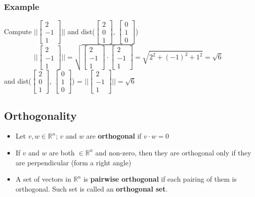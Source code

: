 \subsubsection{Example}
Compute $||\begin{bmatrix} 2 \\ -1 \\ 1 \end{bmatrix}||$ and 
dist($\begin{bmatrix} 2 \\ 0 \\ 1 \end{bmatrix}$, $\begin{bmatrix} 0 \\ 1 \\ 0 \end{bmatrix}$)
\[
  ||\begin{bmatrix} 2 \\ -1 \\ 1 \end{bmatrix}|| 
  = \sqrt{\begin{bmatrix} 2 \\ -1 \\ 1 \end{bmatrix} \cdot \begin{bmatrix} 2 \\ -1 \\ 1 \end{bmatrix}}
  = \sqrt{2^2 + (-1)^2 + 1^2} = \sqrt{6}
\]
and dist($\begin{bmatrix} 2 \\ 0 \\ 1 \end{bmatrix}$, $\begin{bmatrix} 0 \\ 1 \\ 0 \end{bmatrix}$) = $||\begin{bmatrix} 2 \\ -1 \\ 1 \end{bmatrix}|| = \sqrt{6}$
\subsection{Orthogonality}
\begin{itemize}
  \item Let $v, w \in \mathbb{R}^n$; $v$ and $w$ are \textbf{orthogonal} if $v \cdot w = 0$
  \item If $v$ and $w$ are both $\in \mathbb{R}^n$ and non-zero, then they are orthogonal only if they are perpendicular (form a right angle)
  \item A set of vectors in $\mathbb{R}^n$ is \textbf{pairwise orthogonal} if each pairing of them is orthogonal. Such set is called an \textbf{orthogonal set}.
\end{itemize}

